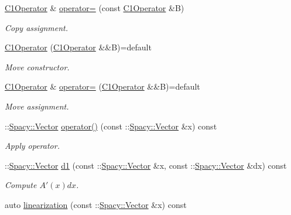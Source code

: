 \begin{DoxyCompactItemize}
\item 
\hyperlink{classSpacy_1_1Kaskade_1_1C1Operator}{C1\-Operator} \& \hyperlink{classSpacy_1_1Kaskade_1_1C1Operator_ac378b7b319e5160a7ac19a3697b4291a}{operator=} (const \hyperlink{classSpacy_1_1Kaskade_1_1C1Operator}{C1\-Operator} \&B)
\begin{DoxyCompactList}\small\item\em Copy assignment. \end{DoxyCompactList}\item 
\hyperlink{classSpacy_1_1Kaskade_1_1C1Operator_aed7bcf133fe772d9ae4b6ad5dcd5674c}{C1\-Operator} (\hyperlink{classSpacy_1_1Kaskade_1_1C1Operator}{C1\-Operator} \&\&B)=default
\begin{DoxyCompactList}\small\item\em Move constructor. \end{DoxyCompactList}\item 
\hyperlink{classSpacy_1_1Kaskade_1_1C1Operator}{C1\-Operator} \& \hyperlink{classSpacy_1_1Kaskade_1_1C1Operator_ab05b1e6565daf571d60ecf1b4584c991}{operator=} (\hyperlink{classSpacy_1_1Kaskade_1_1C1Operator}{C1\-Operator} \&\&B)=default
\begin{DoxyCompactList}\small\item\em Move assignment. \end{DoxyCompactList}\item 
\-::\hyperlink{classSpacy_1_1Vector}{Spacy\-::\-Vector} \hyperlink{classSpacy_1_1Kaskade_1_1C1Operator_aae23a007cd7a66f90bbb1c93da34735d}{operator()} (const \-::\hyperlink{classSpacy_1_1Vector}{Spacy\-::\-Vector} \&x) const 
\begin{DoxyCompactList}\small\item\em Apply operator. \end{DoxyCompactList}\item 
\-::\hyperlink{classSpacy_1_1Vector}{Spacy\-::\-Vector} \hyperlink{classSpacy_1_1Kaskade_1_1C1Operator_a32cfd05c372cc4bc8d7e0e8aedc1e8b9}{d1} (const \-::\hyperlink{classSpacy_1_1Vector}{Spacy\-::\-Vector} \&x, const \-::\hyperlink{classSpacy_1_1Vector}{Spacy\-::\-Vector} \&dx) const 
\begin{DoxyCompactList}\small\item\em Compute $A'(x)dx$. \end{DoxyCompactList}\item 
\hypertarget{classSpacy_1_1Kaskade_1_1C1Operator_afb9837bb1c40e00b53e7430c745b1931}{auto \hyperlink{classSpacy_1_1Kaskade_1_1C1Operator_afb9837bb1c40e00b53e7430c745b1931}{linearization} (const \-::\hyperlink{classSpacy_1_1Vector}{Spacy\-::\-Vector} \&x) const }\label{classSpacy_1_1Kaskade_1_1C1Operator_afb9837bb1c40e00b53e7430c745b1931}


\end{DoxyCompactItemize}
